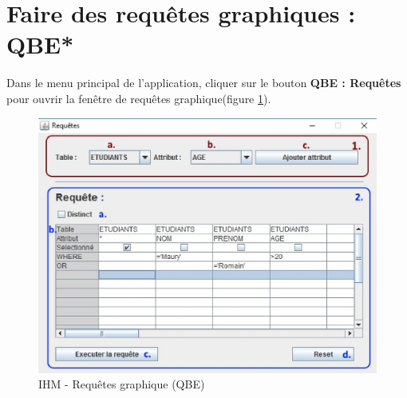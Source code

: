 \section{Faire des requêtes graphiques : QBE*}

Dans le menu principal de l'application, cliquer sur le bouton \textbf{QBE : Requêtes} pour ouvrir la fenêtre de requêtes graphique(figure \ref{qbe_gui}).

\begin{figure}[!h]
\centering
\includegraphics[width=12cm]{./images/manuel/qbe.eps}
\caption{IHM - Requêtes graphique (QBE)}
\label{qbe_gui}
\end{figure}

